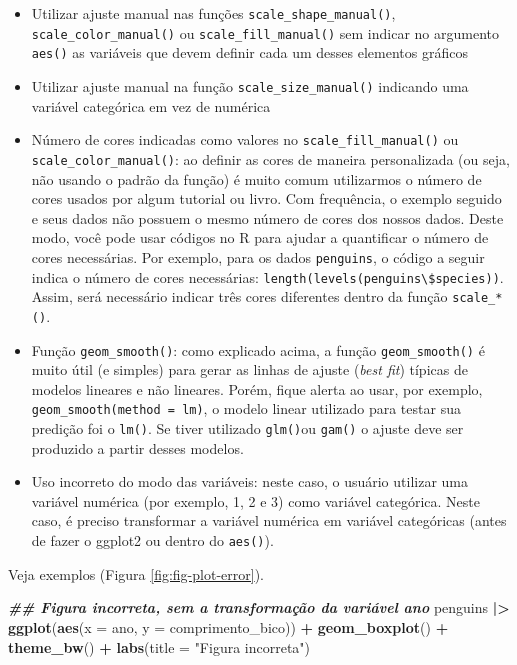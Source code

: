 \documentclass[
]{article}
\newenvironment{Shaded}{\begin{snugshade}}{\end{snugshade}}
\newcommand{\AttributeTok}[1]{\textcolor[rgb]{0.13,0.29,0.53}{#1}}
\newcommand{\DocumentationTok}[1]{\textcolor[rgb]{0.56,0.35,0.01}{\textbf{\textit{#1}}}}
\newcommand{\FunctionTok}[1]{\textcolor[rgb]{0.13,0.29,0.53}{\textbf{#1}}}
\newcommand{\NormalTok}[1]{#1}
\newcommand{\SpecialCharTok}[1]{\textcolor[rgb]{0.81,0.36,0.00}{\textbf{#1}}}
\newcommand{\StringTok}[1]{\textcolor[rgb]{0.31,0.60,0.02}{#1}}
\begin{document}
\begin{itemize}
\item
  Utilizar ajuste manual nas funções \texttt{scale\_shape\_manual()}, \texttt{scale\_color\_manual()} ou \texttt{scale\_fill\_manual()} sem indicar no argumento \texttt{aes()} as variáveis que devem definir cada um desses elementos gráficos
\item
  Utilizar ajuste manual na função \texttt{scale\_size\_manual()} indicando uma variável categórica em vez de numérica
\item
  Número de cores indicadas como valores no \texttt{scale\_fill\_manual()} ou \texttt{scale\_color\_manual()}: ao definir as cores de maneira personalizada (ou seja, não usando o padrão da função) é muito comum utilizarmos o número de cores usados por algum tutorial ou livro. Com frequência, o exemplo seguido e seus dados não possuem o mesmo número de cores dos nossos dados. Deste modo, você pode usar códigos no R para ajudar a quantificar o número de cores necessárias. Por exemplo, para os dados \texttt{penguins}, o código a seguir indica o número de cores necessárias: \texttt{length(levels(penguins\textbackslash{}\$species))}. Assim, será necessário indicar três cores diferentes dentro da função \texttt{scale\_*()}.
\item
  Função \texttt{geom\_smooth()}: como explicado acima, a função \texttt{geom\_smooth()} é muito útil (e simples) para gerar as linhas de ajuste (\emph{best fit}) típicas de modelos lineares e não lineares. Porém, fique alerta ao usar, por exemplo, \texttt{geom\_smooth(method\ =\ lm)}, o modelo linear utilizado para testar sua predição foi o \texttt{lm()}. Se tiver utilizado \texttt{glm()}ou \texttt{gam()} o ajuste deve ser produzido a partir desses modelos.
\item
  Uso incorreto do modo das variáveis: neste caso, o usuário utilizar uma variável numérica (por exemplo, 1, 2 e 3) como variável categórica. Neste caso, é preciso transformar a variável numérica em variável categóricas (antes de fazer o ggplot2 ou dentro do \texttt{aes()}).
\end{itemize}

Veja exemplos (Figura \ref{fig:fig-plot-error}).

\begin{Shaded}
\begin{Highlighting}[]
\DocumentationTok{\#\# Figura incorreta, sem a transformação da variável ano}
\NormalTok{penguins }\SpecialCharTok{|\textgreater{}}
    \FunctionTok{ggplot}\NormalTok{(}\FunctionTok{aes}\NormalTok{(}\AttributeTok{x =}\NormalTok{ ano, }\AttributeTok{y =}\NormalTok{ comprimento\_bico)) }\SpecialCharTok{+}
    \FunctionTok{geom\_boxplot}\NormalTok{() }\SpecialCharTok{+} 
    \FunctionTok{theme\_bw}\NormalTok{() }\SpecialCharTok{+}
    \FunctionTok{labs}\NormalTok{(}\AttributeTok{title =} \StringTok{"Figura incorreta"}\NormalTok{)}
\end{Highlighting}
\end{Shaded}
\end{document}

